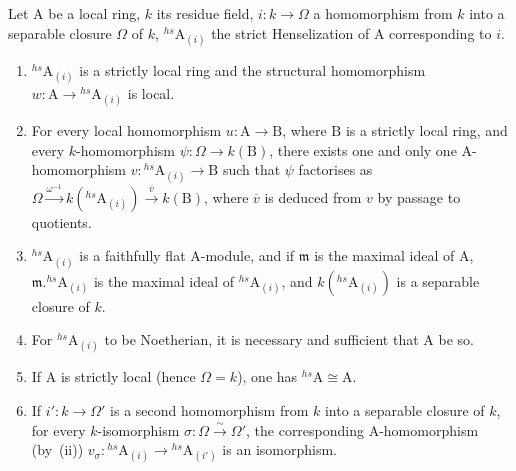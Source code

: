 \begin{proposition}[18.8.8]
\label{IV.18.8.8}
Let $\mathrm{A}$ be a local ring, $k$ its residue field, $i:k\to\Omega$ a homomorphism from $k$ into a separable closure $\Omega$ of $k$, ${}^{hs}\!\mathrm{A}_{(i)}$ the strict Henselization of $\mathrm{A}$ corresponding to $i$.
\begin{enumerate}[label=\emph{\roman*)}]
  \item ${}^{hs}\!\mathrm{A}_{(i)}$ is a strictly local ring  and the structural homomorphism $w:\mathrm{A}\to{}^{hs}\!\mathrm{A}_{(i)}$ is local.
  \item For every local homomorphism $u:\mathrm{A}\to\mathrm{B}$, where $\mathrm{B}$ is a strictly local ring, and every $k$-homomorphism $\psi:\Omega\to k(\mathrm{B})$, there exists one and only one A-homomorphism $v:{}^{hs}\!\mathrm{A}_{(i)}\to\mathrm{B}$ such that $\psi$ factorises as $\Omega\xrightarrow{\omega^{-1}}k({}^{hs}\!\mathrm{A}_{(i)})\xrightarrow{\overline{v}}k(\mathrm{B})$, where $\overline{v}$ is deduced from $v$ by passage to quotients.
  \item ${}^{hs}\!\mathrm{A}_{(i)}$ is a faithfully flat A-module, and if $\mathfrak{m}$ is the maximal ideal of A, $\mathfrak{m}.{}^{hs}\!\mathrm{A}_{(i)}$ is the maximal ideal of ${}^{hs}\!\mathrm{A}_{(i)}$, and $k({}^{hs}\!\mathrm{A}_{(i)})$ is a separable closure of $k$.
  \item For ${}^{hs}\!\mathrm{A}_{(i)}$ to be Noetherian, it is necessary and sufficient that A be so.
  \item If A is strictly local (hence $\Omega=k$), one has ${}^{hs}\!\mathrm{A}\cong\mathrm{A}$.
  \item If $i':k\to\Omega'$ is a second homomorphism from $k$ into a separable closure of $k$, for every $k$-isomorphism $\sigma:\Omega\xrightarrow{\sim}\Omega'$, the corresponding A-homomorphism (by~(ii)) $v_\sigma:{}^{hs}\!\mathrm{A}_{(i)}\to{}^{hs}\!\mathrm{A}_{(i')}$ is an isomorphism.
\end{enumerate}
\end{proposition}

